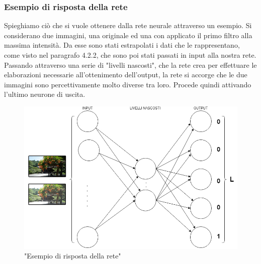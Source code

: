 \documentclass[a4paper,11pt]{article}
\begin{document}
    \subsubsection{Esempio di risposta della rete}
    Spieghiamo ciò che si vuole ottenere dalla rete neurale attraverso un esempio. Si considerano due immagini, una originale ed una con applicato il primo filtro alla massima intensità.
    Da esse sono stati estrapolati i dati che le rappresentano, come visto nel paragrafo 4.2.2, che sono poi stati passati in input alla nostra rete.
    Passando attraverso una serie di "livelli nascosti", che la rete crea per effettuare le elaborazioni necessarie all'ottenimento dell'output,
    la rete si accorge che le due immagini sono percettivamente molto diverse tra loro. Procede quindi attivando l'ultimo neurone di uscita.
    \begin{figure}[h]
        \centering
        \includegraphics[scale=0.4]{reteneurale}
        \caption{"Esempio di risposta della rete"}
    \end{figure}

    \newpage
\end{document}
